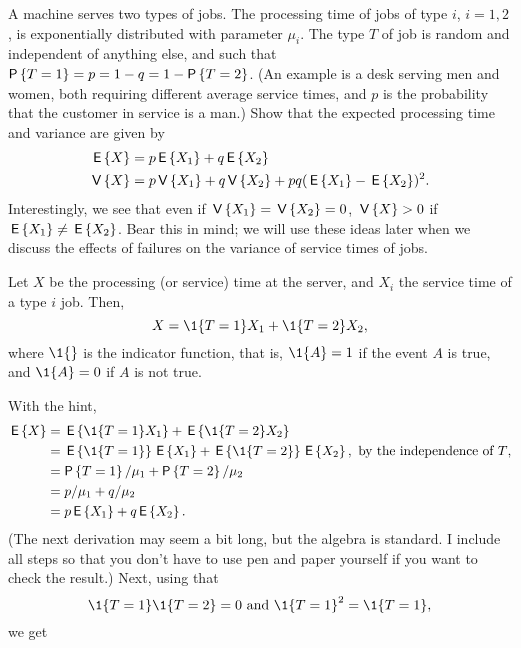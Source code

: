 \begin{exercise}
  A machine serves two types of jobs. The processing time of jobs of
  type $i$, $i=1,2$, is exponentially distributed with parameter
  $\mu_i$. The type $T$ of job is random and independent of anything
  else, and such that $\P{T=1} = p = 1-q = 1-\P{T=2}$. (An example
  is a desk serving men and women, both requiring different average
  service times, and $p$ is the probability that the customer in
  service is a man.)  Show that  the expected processing time  and  variance are given by
\begin{align*}
  \,\mathsf{E}\left\{X\right\} &= p \,\mathsf{E}\left\{X_1\right\}  + q \,\mathsf{E}\left\{X_2\right\} \\
\,\mathsf{V}\left\{X\right\} &= p \,\mathsf{V}\left\{X_1\right\} + q \,\mathsf{V}\left\{X_2\right\} + pq(\,\mathsf{E}\left\{X_1\right\} - \,\mathsf{E}\left\{X_2\right\})^2.
  \end{align*}
Interestingly, we see that even if $\,\mathsf{V}\left\{X_1\right\} = \,\mathsf{V}\left\{X_2\right\} = 0$, $\,\mathsf{V}\left\{X\right\} > 0$
if $\,\mathsf{E}\left\{X_1\right\} \neq \,\mathsf{E}\left\{X_2\right\}$. Bear this in mind; we will use these ideas
later when we discuss the effects of failures on the variance of
service times of jobs.
\begin{hint}
    Let $X$ be the processing (or service) time at the server, and
    $X_i$ the service time of a type $i$ job. Then, 
    \begin{equation*}
      X = \1{T=1} X_1 + \1{T=2} X_2,
    \end{equation*}
    where $\1{}$ is the indicator function, that is, $\1{A}=1$ if the
    event $A$ is true, and $\1{A}=0$ if $A$ is not true.   
\end{hint}
  \begin{solution}
With the hint, 
\begin{equation*}
  \begin{split}
  \E X 
&= \E{\1{T=1} X_1} + \E{\1{T=2} X_2} \\
&= \E{\1{T=1}} \E{ X_1} + \E{\1{T=2}} \E{X_2}, \text{ by the independence of $T$}, \\
&= \P{T=1} /\mu_1 + \P{T=2}/ \mu_2 \\
&= p /\mu_1 + q/ \mu_2 \\
&= p \E{X_1}  + q \E{X_2}.
  \end{split}
\end{equation*}
(The next derivation may seem a bit long, but the algebra is
standard. I include all steps so that you don't have to use pen and
paper yourself if you want to check the result.) Next, using that
\begin{equation*}
\1{T=1}\1{T=2} = 0 \text{ and } \1{T=1}^2 = \1{T=1},
\end{equation*}
we get
\begin{equation*}

\end{equation*}
\end{solution}
\end{exercise}
